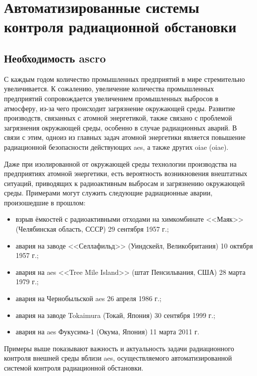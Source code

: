 \chapter{Автоматизированные системы контроля радиационной обстановки}


\section{Необходимость \ac{ascro}}

С каждым годом количество промышленных предприятий в мире стремительно увеличивается. К сожалению, увеличение количества 
промышленных предприятий сопровождается увеличением промышленных выбросов в атмосферу, из-за чего происходит загрязнение 
окружающей среды. Развитие производств, связанных с атомной энергетикой, также связано с проблемой загрязнения 
окружающей среды, особенно в случае радиационных аварий. В связи с этим, одноиз из главных задач атомной энергетики 
является повышение радиационной безопасности действующих \ac{aes}, а также других \ac{oiae} (\acl{oiae}).

Даже при изолированной от окружающей среды технологии производства на предприятиях атомной энергетики, есть вероятность 
возникновения внештатных ситуаций, приводящих к радиоактивным выбросам и загрязнению окружающей среды. Примерами могут 
служить следующие радиационные аварии, произошедшие в прошлом:

\begin{itemize}
	\item взрыв ёмкостей с радиоактивными отходами на химкомбинате <<Маяк>> (Челябинская область, СССР) 29 сентября 
		1957 г.;
	\item авария на заводе <<Селлафильд>> (Уиндскейл, Великобритания) 10 октября 1957 г.;
	\item авария на \ac{aes} <<Tree Mile Island>> (штат Пенсильвания, США) 28 марта 1979 г.;
	\item авария на Чернобыльской \ac{aes} 26 апреля 1986 г.;
	\item авария на заводе Tokaimura (Токай, Япония) 30 сентября 1999 г.;
	\item авария на \ac{aes} Фукусима-1 (Окума, Япония) 11 марта 2011 г.
\end{itemize}

Примеры выше показывают важность и актуальность задачи радиационного контроля внешней среды вблизи \ac{aes}, 
осуществляемого автоматизированной системой контроля радиационной обстановки. 

